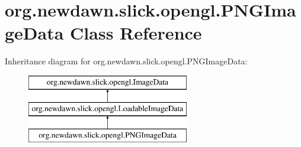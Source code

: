 \hypertarget{classorg_1_1newdawn_1_1slick_1_1opengl_1_1_p_n_g_image_data}{}\section{org.\+newdawn.\+slick.\+opengl.\+P\+N\+G\+Image\+Data Class Reference}
\label{classorg_1_1newdawn_1_1slick_1_1opengl_1_1_p_n_g_image_data}
Inheritance diagram for org.\+newdawn.\+slick.\+opengl.\+P\+N\+G\+Image\+Data\+:\begin{figure}[H]
\begin{center}
\leavevmode
\includegraphics[height=3.000000cm]{classorg_1_1newdawn_1_1slick_1_1opengl_1_1_p_n_g_image_data}
\end{center}
\end{figure}
